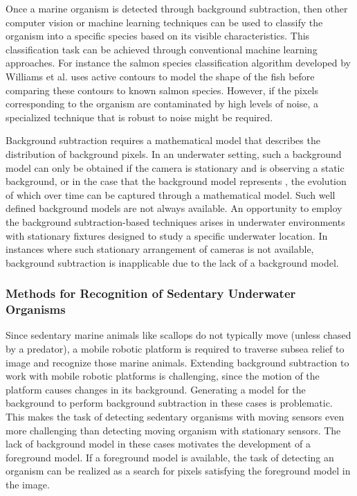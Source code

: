 \documentclass {udthesis}
\begin{document}
Once a marine organism is detected through background subtraction, then other computer vision or machine learning techniques can be used to classify the organism into a specific species based on its visible characteristics. This classification task can be achieved through conventional machine learning approaches. For instance the salmon species classification algorithm developed by Williams et al. \cite{williams} uses active contours to model the shape of the fish before comparing these contours to known salmon species. However, if the pixels corresponding to the organism are contaminated by high levels of noise, a specialized technique that is robust to noise might be required.

Background subtraction requires a mathematical model that describes the distribution of background pixels. In an underwater setting, such a background model can only be obtained if the camera is stationary and is observing a static background, or in the case that the background model represents , the evolution of which over time can be captured through a mathematical model. Such well defined background models are not always available. An opportunity to employ the background subtraction-based techniques arises in underwater environments with stationary fixtures designed to study a specific underwater location. In instances where such stationary arrangement of cameras is not available, background subtraction is inapplicable due to the lack of a background model.


\subsubsection{Methods for Recognition of Sedentary Underwater Organisms}

Since sedentary marine animals like scallops do not typically move (unless chased by a predator), a mobile robotic platform is required to traverse subsea relief to image and recognize those marine animals. Extending background subtraction to work with mobile robotic platforms is challenging, since the motion of the platform causes changes in its background. Generating a model for the background to perform background subtraction in these cases is problematic. This makes the task of detecting sedentary organisms with moving sensors even more challenging than detecting moving organism with stationary sensors. The lack of background model in these cases motivates the development of a foreground model. If a foreground model is available, the task of detecting an organism can be realized as a search for pixels satisfying the foreground model in the image.
\end{document}
